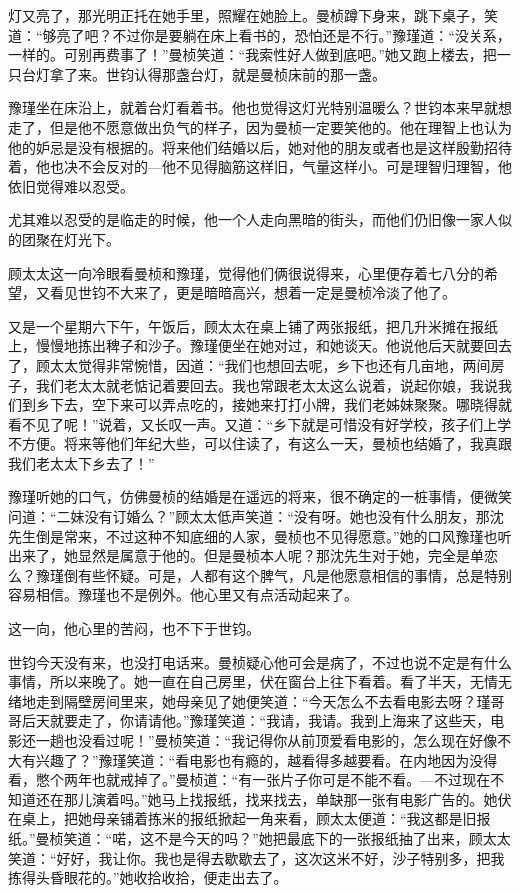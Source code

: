 \par 灯又亮了，那光明正托在她手里，照耀在她脸上。曼桢蹲下身来，跳下桌子，笑道：“够亮了吧？不过你是要躺在床上看书的，恐怕还是不行。”豫瑾道：“没关系，一样的。可别再费事了！”曼桢笑道：“我索性好人做到底吧。”她又跑上楼去，把一只台灯拿了来。世钧认得那盏台灯，就是曼桢床前的那一盏。
\par 豫瑾坐在床沿上，就着台灯看着书。他也觉得这灯光特别温暖么？世钧本来早就想走了，但是他不愿意做出负气的样子，因为曼桢一定要笑他的。他在理智上也认为他的妒忌是没有根据的。将来他们结婚以后，她对他的朋友或者也是这样殷勤招待着，他也决不会反对的—他不见得脑筋这样旧，气量这样小。可是理智归理智，他依旧觉得难以忍受。
\par 尤其难以忍受的是临走的时候，他一个人走向黑暗的街头，而他们仍旧像一家人似的团聚在灯光下。
\par 顾太太这一向冷眼看曼桢和豫瑾，觉得他们俩很说得来，心里便存着七八分的希望，又看见世钧不大来了，更是暗暗高兴，想着一定是曼桢冷淡了他了。
\par 又是一个星期六下午，午饭后，顾太太在桌上铺了两张报纸，把几升米摊在报纸上，慢慢地拣出稗子和沙子。豫瑾便坐在她对过，和她谈天。他说他后天就要回去了，顾太太觉得非常惋惜，因道：“我们也想回去呢，乡下也还有几亩地，两间房子，我们老太太就老惦记着要回去。我也常跟老太太这么说着，说起你娘，我说我们到乡下去，空下来可以弄点吃的，接她来打打小牌，我们老姊妹聚聚。哪晓得就看不见了呢！”说着，又长叹一声。又道：“乡下就是可惜没有好学校，孩子们上学不方便。将来等他们年纪大些，可以住读了，有这么一天，曼桢也结婚了，我真跟我们老太太下乡去了！”
\par 豫瑾听她的口气，仿佛曼桢的结婚是在遥远的将来，很不确定的一桩事情，便微笑问道：“二妹没有订婚么？”顾太太低声笑道：“没有呀。她也没有什么朋友，那沈先生倒是常来，不过这种不知底细的人家，曼桢也不见得愿意。”她的口风豫瑾也听出来了，她显然是属意于他的。但是曼桢本人呢？那沈先生对于她，完全是单恋么？豫瑾倒有些怀疑。可是，人都有这个脾气，凡是他愿意相信的事情，总是特别容易相信。豫瑾也不是例外。他心里又有点活动起来了。
\par 这一向，他心里的苦闷，也不下于世钧。
\par 世钧今天没有来，也没打电话来。曼桢疑心他可会是病了，不过也说不定是有什么事情，所以来晚了。她一直在自己房里，伏在窗台上往下看着。看了半天，无情无绪地走到隔壁房间里来，她母亲见了她便笑道：“今天怎么不去看电影去呀？瑾哥哥后天就要走了，你请请他。”豫瑾笑道：“我请，我请。我到上海来了这些天，电影还一趟也没看过呢！”曼桢笑道：“我记得你从前顶爱看电影的，怎么现在好像不大有兴趣了？”豫瑾笑道：“看电影也有瘾的，越看得多越要看。在内地因为没得看，憋个两年也就戒掉了。”曼桢道：“有一张片子你可是不能不看。—不过现在不知道还在那儿演着吗。”她马上找报纸，找来找去，单缺那一张有电影广告的。她伏在桌上，把她母亲铺着拣米的报纸掀起一角来看，顾太太便道：“我这都是旧报纸。”曼桢笑道：“喏，这不是今天的吗？”她把最底下的一张报纸抽了出来，顾太太笑道：“好好，我让你。我也是得去歇歇去了，这次这米不好，沙子特别多，把我拣得头昏眼花的。”她收拾收拾，便走出去了。
